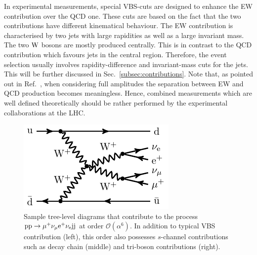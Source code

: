 In experimental measurements, special VBS-cuts are designed to enhance the EW contribution over the QCD one.
These cuts are based on the fact that the two contributions have different kinematical behaviour.
The EW contribution is characterised by two jets with large rapidities as well as a large invariant mass.
The two $\text{W}$ bosons are mostly produced centrally.
This is in contrast to the QCD contribution which favours jets in the central region.
Therefore, the event selection usually involves rapidity-difference and invariant-mass cuts for the jets.
This will be further discussed in Sec.~\ref{subsec:contributions}.
Note that, as pointed out in Ref.~\cite{Biedermann:2017bss}, when considering full amplitudes the separation between EW and QCD production becomes meaningless.
Hence, combined measurements which are well defined theoretically should be rather performed by the experimental collaborations at the LHC.


\begin{figure}[t]
\begin{center}
          \includegraphics[width=0.30\linewidth]{feynman/LO_EW_5}
\end{center}
        \caption{Sample tree-level diagrams that contribute to the process $\text{p}\text{p}\to\mu^+\nu_\mu\text{e}^+\nu_{\text{e}}\text{j}\text{j}$ at order $\mathcal{O}{\left(\alpha^{6}\right)}$.
        In addition to typical VBS contribution (left), this order also possesses $s$-channel contributions such as decay chain (middle) and tri-boson contributions (right).}
\label{diag:LO}
\end{figure}
